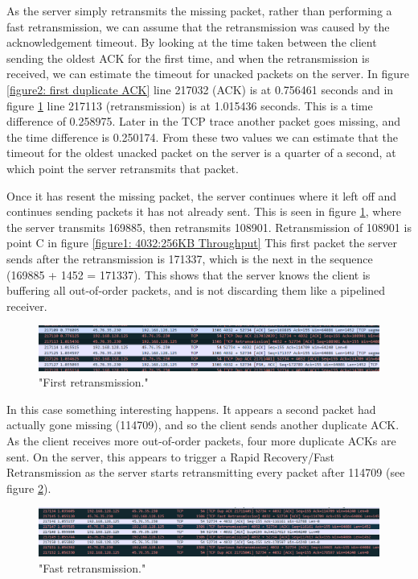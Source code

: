 \documentclass[12pt]{article}
\begin{document}
As the server simply retransmits the missing packet, rather than performing a fast retransmission, we can assume that the retransmission was caused by the acknowledgement timeout.
By looking at the time taken between the client sending the oldest ACK for the first time, and when the retransmission is received, we can estimate the timeout for unacked packets on the server.
In figure \ref{figure2: first duplicate ACK} line 217032 (ACK) is at 0.756461 seconds and in figure \ref{figure4: First retransmission} line 217113 (retransmission) is at 1.015436 seconds.
This is a time difference of 0.258975.
Later in the TCP trace another packet goes missing, and the time difference is 0.250174.
From these two values we can estimate that the timeout for the oldest unacked packet on the server is a quarter of a second, at which point the server retransmits that packet.

Once it has resent the missing packet, the server continues where it left off and continues sending packets it has not already sent.
This is seen in figure \ref{figure4: First retransmission}, where the server transmits 169885, then retransmits 108901.
Retransmission of 108901 is point C in figure \ref{figure1: 4032:256KB Throughput}
This first packet the server sends after the retransmission is 171337, which is the next in the sequence (169885 + 1452 = 171337).
This shows that the server knows the client is buffering all out-of-order packets, and is not discarding them like a pipelined receiver.

\begin{figure}[!htbp]
  \centering
  \includegraphics[width=\linewidth]{4032-256KB-retransmission.PNG}
  \caption{"First retransmission."}
  \label{figure4: First retransmission}
\end{figure}

In this case something interesting happens.
It appears a second packet had actually gone missing (114709), and so the client sends another duplicate ACK.
As the client receives more out-of-order packets, four more duplicate ACKs are sent.
On the server, this appears to trigger a Rapid Recovery/Fast Retransmission as the server starts retransmitting every packet after 114709 (see figure \ref{figure5: Fast retransmission}).

\begin{figure}[!htbp]
  \centering
  \includegraphics[width=\linewidth]{4032-256KB-fast-retransmission.PNG}
  \caption{"Fast retransmission."}
  \label{figure5: Fast retransmission}
\end{figure}
\end{document}
